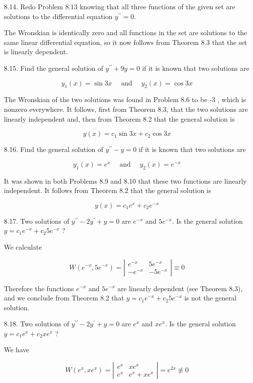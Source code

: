 \documentclass[10pt]{article}
\begin{document}
8.14. Redo Problem 8.13 knowing that all three functions of the given set are solutions to the differential equation $y^{\prime \prime}=0$.

The Wronskian is identically zero and all functions in the set are solutions to the same linear differential equation, so it now follows from Theorem 8.3 that the set is linearly dependent.

8.15. Find the general solution of $y^{\prime \prime}+9 y=0$ if it is known that two solutions are

$$
y_{1}(x)=\sin 3 x \quad \text { and } \quad y_{2}(x)=\cos 3 x
$$

The Wronskian of the two solutions was found in Problem 8.6 to be -3 , which is nonzero everywhere. It follows, first from Theorem 8.3, that the two solutions are linearly independent and, then from Theorem 8.2 that the general solution is

$$
y(x)=c_{1} \sin 3 x+c_{2} \cos 3 x
$$

8.16. Find the general solution of $y^{\prime \prime}-y=0$ if it is known that two solutions are

$$
y_{1}(x)=e^{x} \quad \text { and } \quad y_{2}(x)=e^{-x}
$$

It was shown in both Problems 8.9 and 8.10 that these two functions are linearly independent. It follows from Theorem 8.2 that the general solution is

$$
y(x)=c_{1} e^{x}+c_{2} e^{-x}
$$

8.17. Two solutions of $y^{\prime \prime}-2 y^{\prime}+y=0$ are $e^{-x}$ and $5 e^{-x}$. Is the general solution $y=c_{1} e^{-x}+c_{2} 5 e^{-x}$ ?

We calculate

$$
W\left(e^{-x}, 5 e^{-x}\right)=\left|\begin{array}{cc}
e^{-x} & 5 e^{-x} \\
-e^{-x} & -5 e^{-x}
\end{array}\right| \equiv 0
$$

Therefore the functions $e^{-x}$ and $5 e^{-x}$ are linearly dependent (see Theorem 8.3), and we conclude from Theorem 8.2 that $y=c_{1} e^{-x}+c_{2} 5 e^{-x}$ is not the general solution.

8.18. Two solutions of $y^{\prime \prime}-2 y^{\prime}+y=0$ are $e^{x}$ and $x e^{x}$. Is the general solution $y=c_{1} e^{x}+c_{2} x e^{x}$ ?

We have

$$
W\left(e^{x}, x e^{x}\right)=\left|\begin{array}{cc}
e^{x} & x e^{x} \\
e^{x} & e^{x}+x e^{x}
\end{array}\right|=e^{2 x} \not \equiv 0
$$
\end{document}

